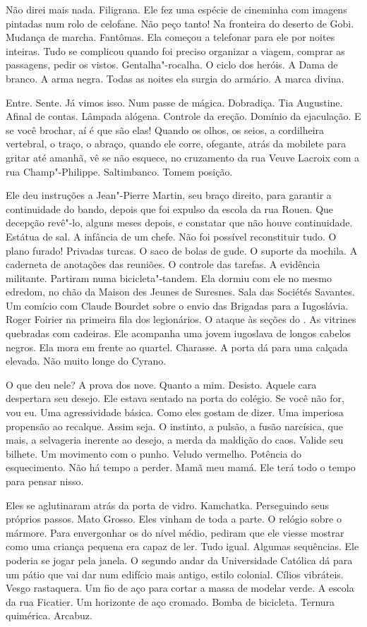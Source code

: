 Não direi mais nada. Filigrana. Ele fez uma espécie de cineminha com
imagens pintadas num rolo de celofane. Não peço tanto! Na fronteira do
deserto de Gobi. Mudança de marcha. Fantômas. Ela começou a telefonar
para ele por noites inteiras. Tudo se complicou quando foi preciso
organizar a viagem, comprar as passagens, pedir os vistos.
Gentalha"-rocalha. O ciclo dos heróis. A Dama de branco. A arma negra.
Todas as noites ela surgia do armário. A marca divina.

Entre. Sente. Já vimos isso. Num passe de mágica. Dobradiça. Tia
Augustine. Afinal de contas. Lâmpada alógena. Controle da ereção.
Domínio da ejaculação. E se você brochar, aí é que são elas! Quando os
olhos, os seios, a cordilheira vertebral, o traço, o abraço, quando ele
corre, ofegante, atrás da mobilete para gritar até amanhã, vê se não
esquece, no cruzamento da rua Veuve Lacroix com a rua Champ"-Philippe.
Saltimbanco. Tomem posição.

Ele deu instruções a Jean"-Pierre Martin, seu braço direito, para
garantir a continuidade do bando, depois que foi expulso da escola da
rua Rouen. Que decepção revê"-lo, alguns meses depois, e constatar que
não houve continuidade. Estátua de sal. A infância de um chefe. Não foi
possível reconstituir tudo. O plano furado! Privadas turcas. O saco de
bolas de gude. O suporte da mochila. A caderneta de anotações das
reuniões. O controle das tarefas. A evidência militante. Partiram numa
bicicleta"-tandem. Ela dormiu com ele no mesmo edredom, no chão da Maison
des Jeunes de Suresnes. Sala das Sociétés Savantes. Um comício com
Claude Bourdet sobre o envio das Brigadas para a Iugoslávia. Roger
Foirier na primeira fila dos legionários. O ataque às seções do . As
vitrines quebradas com cadeiras. Ele acompanha uma jovem iugoslava de
longos cabelos negros. Ela mora em frente ao quartel. Charasse. A porta
dá para uma calçada elevada. Não muito longe do Cyrano.

O que deu nele? A prova dos nove. Quanto a mim. Desisto. Aquele cara
despertara seu desejo. Ele estava sentado na porta do colégio. Se você
não for, vou eu. Uma agressividade básica. Como eles gostam de dizer.
Uma imperiosa propensão ao recalque. Assim seja. O instinto, a pulsão, a
fusão narcísica, que mais, a selvageria inerente ao desejo, a merda da
maldição do caos. Valide seu bilhete. Um movimento com o punho. Veludo
vermelho. Potência do esquecimento. Não há tempo a perder. Mamã meu
mamá. Ele terá todo o tempo para pensar nisso.

Eles se aglutinaram atrás da porta de vidro. Kamchatka. Perseguindo seus
próprios passos. Mato Grosso. Eles vinham de toda a parte. O relógio
sobre o mármore. Para envergonhar os do nível médio, pediram que ele
viesse mostrar como uma criança pequena era capaz de ler. Tudo igual.
Algumas sequências. Ele poderia se jogar pela janela. O segundo andar da
Universidade Católica dá para um pátio que vai dar num edifício mais
antigo, estilo colonial. Cílios vibráteis. Vesgo rastaquera. Um fio de
aço para cortar a massa de modelar verde. A escola da rua Ficatier. Um
horizonte de aço cromado. Bomba de bicicleta. Ternura quimérica.
Arcabuz.

